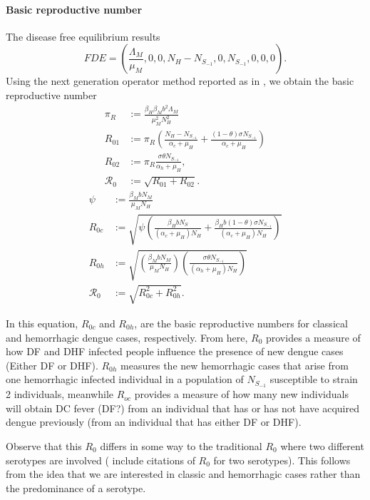 

%
%
\paragraph{Basic reproductive number}
	The disease free equilibrium results
$$
	FDE=
	\left(
		\frac{\Lambda_M}{\mu_M},
		0,
		0,
		N_H - N_{S_{-1}},
		0,
		N_{S_{-1}},
		0,
		0,
		0
	\right).
$$
Using the next generation operator method 
reported as in \cite{Feng1997a}, we obtain
the basic reproductive number
\begin{equation}
	\begin{aligned}
		\pi_R & :=
			\frac{\beta_H \beta_M b^2 \Lambda_M}{
				\mu_M ^ 2  N_H ^ 2 
		}
	\\
		R_{01} & := 
			\pi_R
			\left(
				\frac{N_H - N_{S_{-1}}}{ \alpha_c + \mu_H}
				+
				\frac{(1- \theta ) \sigma N_{S_{-1}}}{ \alpha_c + \mu_H}
			\right)
		\\
		R_{02}& :=
			\pi_R
				\frac{
					\sigma \theta N_{S_{-1}}
				}{\alpha_h + \mu_H},
	\\
	\mathcal{R}_0 & :=
			\sqrt{ R_{01}+R_{02} }.
	\end{aligned}
\end{equation}
%
\begin{equation}
	\begin{aligned}
		\psi &:= \frac{\beta_MbN_M}{\mu_MN_H}
		\\
		R_{0c} & := \sqrt{
			\psi
			\left(
				\frac{\beta_HbN_S}{ (\alpha_c + \mu_H)N_H}
				+
				\frac{\beta_Hb(1- \theta ) \sigma N_{S_{-1}}}{ (\alpha_c + \mu_H)N_H}
			\right)}
		\\
		R_{0h}& :=\sqrt{
			\left(\frac{\beta_MbN_M}{\mu_MN_H}\right)
				\left(\frac{
					\sigma \theta N_{S_{-1}}
				}{(\alpha_h + \mu_H)N_H}\right)}
	\\
	\mathcal{R}_0 & :=
			\sqrt{ R_{0c}^2+R_{0h}^2 }.
	\end{aligned}
\end{equation}

	In this equation, $R_{0c}$ and $R_{0h}$, are the basic reproductive numbers 
for classical and hemorrhagic dengue cases, respectively. From here, $R_0$ 
provides a measure of how DF and DHF infected people influence the presence of 
new dengue cases (Either DF or DHF). $R_{0h}$ measures the new hemorrhagic 
cases that arise from one hemorrhagic infected individual in a population of 
$N_{S_{-1}}$ susceptible to strain 2 individuals, meanwhile $R_{oc}$ provides a 
measure of how many new individuals will obtain DC fever (DF?) from an individual 
that has or has not have acquired dengue previously (from an individual that has either
DF or DHF).

	Observe that this $R_0$ differs in some way to the traditional $R_0$ where two
different serotypes are involved (\cite{Feng1997a} include citations of $R_0$ for two serotypes).
This follows from the idea that we are interested in classic and hemorrhagic
cases rather than the predominance of a serotype.





